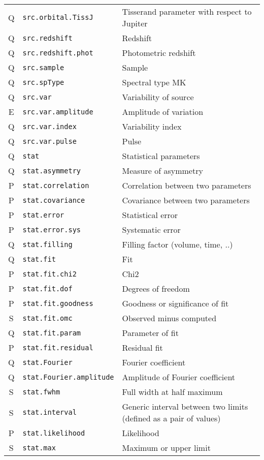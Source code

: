 \documentclass[11pt,a4paper]{ivoa}
\begin{document}
\begin{longtable}[h!]{c|p{40ex}|p{}}
Q & {\tt src.orbital.TissJ} & Tisserand parameter with respect to Jupiter\\
Q & {\tt src.redshift} & Redshift\\
Q & {\tt src.redshift.phot} & Photometric redshift\\
Q & {\tt src.sample} & Sample\\
Q & {\tt src.spType} & Spectral type MK\\
Q & {\tt src.var} & Variability of source\\
E & {\tt src.var.amplitude} & Amplitude of variation\\
Q & {\tt src.var.index} & Variability index\\
Q & {\tt src.var.pulse} & Pulse\\
Q & {\tt stat} & Statistical parameters\\
Q & {\tt stat.asymmetry} & Measure of asymmetry\\
P & {\tt stat.correlation} & Correlation between two parameters\\
P & {\tt stat.covariance} & Covariance between two parameters\\
P & {\tt stat.error} & Statistical error\\
P & {\tt stat.error.sys} & Systematic error\\
Q & {\tt stat.filling} & Filling factor (volume, time, ..)\\
Q & {\tt stat.fit} & Fit\\
P & {\tt stat.fit.chi2} & Chi2\\
P & {\tt stat.fit.dof} & Degrees of freedom\\
P & {\tt stat.fit.goodness} & Goodness or significance of fit\\
S & {\tt stat.fit.omc} & Observed minus computed\\
Q & {\tt stat.fit.param} & Parameter of fit\\
P & {\tt stat.fit.residual} & Residual fit\\
Q & {\tt stat.Fourier} & Fourier coefficient\\
Q & {\tt stat.Fourier.amplitude} & Amplitude of Fourier coefficient\\
S & {\tt stat.fwhm} & Full width at half maximum\\
S & {\tt stat.interval} & Generic interval between two limits (defined as a pair of values)\\
P & {\tt stat.likelihood} & Likelihood\\
S & {\tt stat.max} & Maximum or upper limit\\

\end{longtable}
\end{document}
